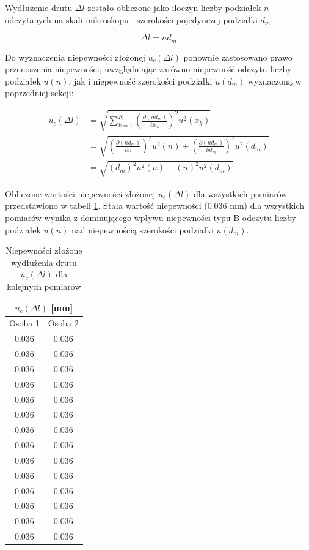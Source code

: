 \documentclass[a4paper,12pt]{article}
\begin{document}
Wydłużenie drutu $\Delta l$ zostało obliczone jako iloczyn liczby podziałek $n$ odczytanych na skali mikroskopu i szerokości pojedynczej podziałki $d_m$:

\begin{equation}
    \Delta l = n d_m
\end{equation}

Do wyznaczenia niepewności złożonej $u_c(\Delta l)$ ponownie zastosowano prawo przenoszenia niepewności, uwzględniając zarówno niepewność odczytu liczby podziałek $u(n)$, jak i niepewność szerokości podziałki $u(d_m)$ wyznaczoną w poprzedniej sekcji:

\begin{align*}
    u_c(\Delta l) & = \sqrt{\sum_{k=1}^{K} \left( \frac{\partial (n d_m)}{\partial x_k} \right)^2 u^2(x_k)}                                            \\
                  & = \sqrt{\left(\frac{\partial (n d_m)}{\partial n}\right)^2 u^2(n) + \left(\frac{\partial (n d_m)}{\partial d_m}\right)^2 u^2(d_m)} \\
                  & = \sqrt{\left(d_m\right)^2 u^2(n) + \left(n\right)^2 u^2(d_m)}
\end{align*}

Obliczone wartości niepewności złożonej $u_c(\Delta l)$ dla wszystkich pomiarów przedstawiono w tabeli \ref{tab:niepewnosci_wydluzenia_drutu}. Stała wartość niepewności (0.036 mm) dla wszystkich pomiarów wynika z dominującego wpływu niepewności typu B odczytu liczby podziałek $u(n)$ nad niepewnością szerokości podziałki $u(d_m)$.

\begin{table}[H]
    \centering
    \begin{tabular}{|c|c|}
        \hline
        \multicolumn{2}{|c|}{$u_c(\Delta l)$ [mm]} \\
        \hline
        Osoba 1 & Osoba 2 \\
        \hline
        0.036 & 0.036 \\
        0.036 & 0.036 \\
        0.036 & 0.036 \\
        0.036 & 0.036 \\
        0.036 & 0.036 \\
        0.036 & 0.036 \\
        0.036 & 0.036 \\
        0.036 & 0.036 \\
        0.036 & 0.036 \\
        0.036 & 0.036 \\
        0.036 & 0.036 \\
        0.036 & 0.036 \\
        0.036 & 0.036 \\
        0.036 & 0.036 \\
        \hline
    \end{tabular}
    \caption{Niepewności złożone wydłużenia drutu $u_c(\Delta l)$ dla kolejnych pomiarów}
    \label{tab:niepewnosci_wydluzenia_drutu}
\end{table}
\end{document}
